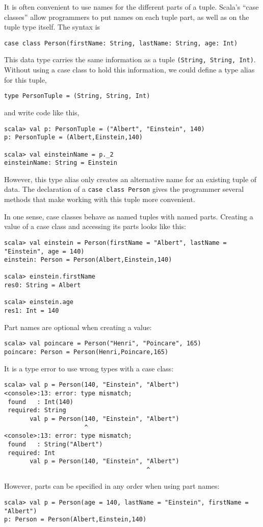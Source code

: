 It is often convenient to use names for the different parts of a tuple.
Scala's ``case classes'' allow programmers to
put names on each tuple part, as well as on the tuple type itself.
The syntax is
\begin{lstlisting}
case class Person(firstName: String, lastName: String, age: Int)
\end{lstlisting}
This data type carries the same information as a tuple \lstinline!(String, String, Int)!.
Without using a case class to hold this information, we could define
a type alias for this tuple,
\begin{lstlisting}
type PersonTuple = (String, String, Int)
\end{lstlisting}
and write code like this,
\begin{lstlisting}
scala> val p: PersonTuple = ("Albert", "Einstein", 140)
p: PersonTuple = (Albert,Einstein,140)

scala> val einsteinName = p._2
einsteinName: String = Einstein 
\end{lstlisting}
However, this type alias only creates an alternative name for an existing
tuple of data. The declaration of a \lstinline!case class Person!
gives the programmer several methods that make working with this tuple
more convenient.

In one sense, case classes behave as named tuples with named parts.
Creating a value of a case class and accessing its parts looks like
this:
\begin{lstlisting}
scala> val einstein = Person(firstName = "Albert", lastName = "Einstein", age = 140)
einstein: Person = Person(Albert,Einstein,140)

scala> einstein.firstName
res0: String = Albert

scala> einstein.age
res1: Int = 140
\end{lstlisting}
Part names are optional when creating a value:
\begin{lstlisting}
scala> val poincare = Person("Henri", "Poincare", 165)
poincare: Person = Person(Henri,Poincare,165)
\end{lstlisting}
It is a type error to use wrong types with a case class:
\begin{lstlisting}
scala> val p = Person(140, "Einstein", "Albert")
<console>:13: error: type mismatch;
 found   : Int(140)
 required: String
       val p = Person(140, "Einstein", "Albert")
                      ^
<console>:13: error: type mismatch;
 found   : String("Albert")
 required: Int
       val p = Person(140, "Einstein", "Albert")
                                       ^
\end{lstlisting}
However, parts can be specified in any order when using part names:
\begin{lstlisting}
scala> val p = Person(age = 140, lastName = "Einstein", firstName = "Albert")
p: Person = Person(Albert,Einstein,140)
\end{lstlisting}


